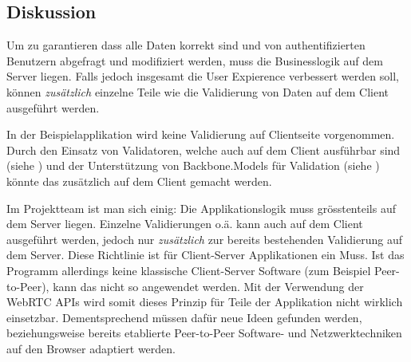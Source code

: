 \subsection*{Diskussion}
Um zu garantieren dass alle Daten korrekt sind und von authentifizierten Benutzern abgefragt und modifiziert werden, muss die Businesslogik auf dem Server liegen.
Falls jedoch insgesamt die User Expierence verbessert werden soll, können \emph{zusätzlich} einzelne Teile wie die Validierung von Daten auf dem Client ausgeführt werden.

In der Beispielapplikation wird keine Validierung auf Clientseite vorgenommen. Durch den Einsatz von Validatoren, welche auch auf dem Client ausführbar sind (siehe \cite{nodevalidator}) und der Unterstützung von Backbone.Models für Validation (siehe \cite{BackboneModelValidation}) könnte das zusätzlich auf dem Client gemacht werden.

Im Projektteam ist man sich einig: Die Applikationslogik muss grösstenteils auf dem Server liegen. Einzelne Validierungen o.ä. kann auch auf dem Client ausgeführt werden, jedoch nur \emph{zusätzlich} zur bereits bestehenden Validierung auf dem Server.
Diese Richtlinie ist für Client-Server Applikationen ein Muss. Ist das Programm allerdings keine klassische Client-Server Software (zum Beispiel Peer-to-Peer), kann das nicht so angewendet werden.
Mit der Verwendung der \gls{WebRTC} APIs wird somit dieses Prinzip für Teile der Applikation nicht wirklich einsetzbar. Dementsprechend müssen dafür neue Ideen gefunden werden, beziehungsweise bereits etablierte Peer-to-Peer Software- und Netzwerktechniken auf den Browser adaptiert werden.